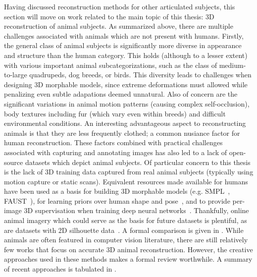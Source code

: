     Having discussed reconstruction methods for other articulated subjects, this section will move on work related to the main topic of this thesis: 3D reconstruction of animal subjects. As summarized above, there are multiple challenges associated with animals which are not present with humans. Firstly, the general class of animal subjects is significantly more diverse in appearance and structure than the human category. This holds (although to a lesser extent) with various important animal subcategorizations, such as the class of medium-to-large quadrupeds, dog breeds, or birds. This diversity leads to challenges when designing 3D morphable models, since extreme deformations must allowed while penalizing even subtle adapations deemed unnatural. Also of concern are the significant variations in animal motion patterns (causing complex self-occlusion), body textures including fur (which vary even within breeds) and difficult environmental conditions. An interesting advantageous aspect to reconstructing animals is that they are less frequently clothed; a common nusiance factor for human reconstruction. These factors combined with practical challenges associated with capturing and annotating images has also led to a lack of open-source datasets which depict animal subjects. Of particular concern to this thesis is the lack of 3D training data captured from real animal subjects (typically using motion capture or static scans). Equivalent resources made available for humans have been used as a basis for building 3D morphable models (e.g. SMPL~\cite{loper15smpl}, FAUST~), for learning priors over human shape and pose~, and to provide per-image 3D supervisation when training deep neural networks~\cite{kanazawa18end-to-end}. Thankfully, online animal imagery which could serve as the basis for future datasets is plentiful, as are datasets with 2D silhouette data~\cite{lin2014microsoft,everingham2010pascal,DAVIS2017-2nd}. A formal comparison is given in .  While animals are often featured in computer vision literature, there are still relatively few works that focus on accurate 3D animal reconstruction. However, the creative approaches used in these methods makes a formal review worthwhile. A summary of recent approaches is tabulated in .
    
    

    


